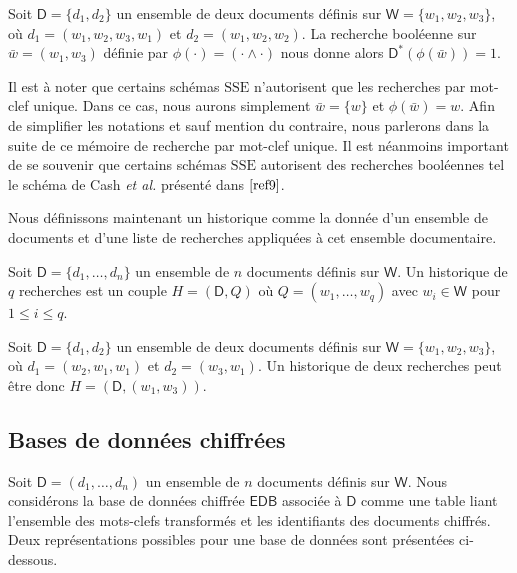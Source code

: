 \begin{exmp}
Soit $\mathsf{D}=\{d_1,d_2\}$ un ensemble de deux documents définis sur
$\mathsf{W}=\{w_1,w_2,w_3\}$, où $d_1=(w_1,w_2,w_3,w_1)$ et $d_2=(w_1,w_2,w_2)$.
La recherche booléenne sur $\bar{w}=(w_1,w_3)$ définie par $\phi(\cdot)=(\cdot
\land \cdot)$ nous donne alors $\mathsf{D}^*(\phi(\bar{w}))=1$.
\end{exmp}

\begin{remark}
Il est à noter que certains schémas $\mathrm{SSE}$ n'autorisent que les
recherches par mot-clef unique. Dans ce cas, nous aurons simplement $\bar{w}=
\{w\}$ et $\phi(\bar{w})=w$. Afin de simplifier les notations et sauf mention du
contraire, nous parlerons dans la suite de ce mémoire de recherche par mot-clef
unique. Il est néanmoins important de se souvenir que certains schémas
$\mathrm{SSE}$ autorisent des recherches booléennes tel le schéma de Cash
\textit{et al.} présenté dans $\mathrm{\cite{ref9}}$.
\end{remark}

Nous définissons maintenant un historique comme la donnée d'un ensemble de
documents et d'une liste de recherches appliquées à cet ensemble documentaire.

\begin{defi}[Historique]
Soit $\mathsf{D}=\{d_1,\dots,d_n\}$ un ensemble de $n$ documents définis sur
$\mathsf{W}$. Un historique de $q$ recherches est un couple $H=(\mathsf{D},Q)$
où $Q=(w_1,\dots,w_q)$ avec $w_i \in \mathsf{W}$ pour $1 \leqslant i \leqslant
q$.
\end{defi}

\begin{exmp}
Soit $\mathsf{D}=\{d_1,d_2\}$ un ensemble de deux documents définis sur
$\mathsf{W}=\{w_1,w_2,w_3\}$, où $d_1=(w_2,w_1,w_1)$ et $d_2=(w_3,w_1)$. Un
historique de deux recherches peut être donc $H=(\mathsf{D},(w_1,w_3))$.
\end{exmp}

\subsection{Bases de données chiffrées}

Soit $\mathsf{D}=(d_1,\dots,d_n)$ un ensemble de $n$ documents définis sur
$\mathsf{W}$. Nous considérons la base de données chiffrée $\mathsf{EDB}$
associée à $\mathsf{D}$ comme une table liant l'ensemble des mots-clefs
transformés et les identifiants des documents chiffrés. Deux représentations
possibles pour une base de données sont présentées ci-dessous.\\


